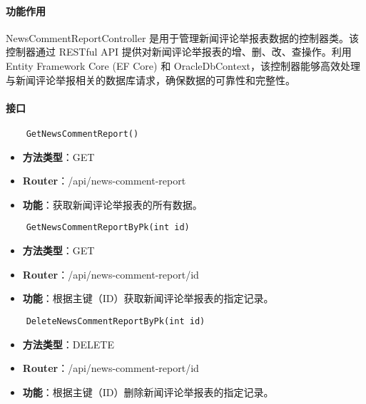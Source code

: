 \paragraph{功能作用}

NewsCommentReportController 是用于管理新闻评论举报表数据的控制器类。该控制器通过 RESTful API 提供对新闻评论举报表的增、删、改、查操作。利用 Entity Framework Core (EF Core) 和 OracleDbContext，该控制器能够高效处理与新闻评论举报相关的数据库请求，确保数据的可靠性和完整性。

\paragraph{接口}

\begin{verbatim}
	GetNewsCommentReport()
\end{verbatim}

\begin{itemize}
	\item \textbf{方法类型}：GET
	\item \textbf{Router}：/api/news-comment-report
	\item \textbf{功能}：获取新闻评论举报表的所有数据。
\end{itemize}

\begin{verbatim}
	GetNewsCommentReportByPk(int id)
\end{verbatim}

\begin{itemize}
	\item \textbf{方法类型}：GET
	\item \textbf{Router}：/api/news-comment-report/{id}
	\item \textbf{功能}：根据主键（ID）获取新闻评论举报表的指定记录。
\end{itemize}

\begin{verbatim}
	DeleteNewsCommentReportByPk(int id)
\end{verbatim}

\begin{itemize}
	\item \textbf{方法类型}：DELETE
	\item \textbf{Router}：/api/news-comment-report/{id}
	\item \textbf{功能}：根据主键（ID）删除新闻评论举报表的指定记录。
\end{itemize}

